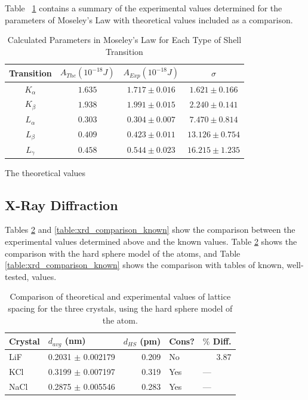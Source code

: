 \documentclass[%
 reprint,
 amsmath,amssymb,
 aps,
 pra,
]{revtex4-1}
\begin{document}
Table ~\ref{Tab:MoseLawSummary} contains a summary of the experimental values determined for the parameters of Moseley's Law with theoretical values included as a comparison.

\begin{table}[htbp]
	\begin{center}
		\begin{tabular}{|c|c|c|c|}
			\hline Transition & $A_{The} (10^{-18} J)$  & $A_{Exp} (10^{-18} J) $ & $\sigma$ \\
			\hline $K_{\alpha}$ & $1.635$ & $1.717 \pm 0.016$ & $1.621 \pm 0.166$ \\
			\hline $K_{\beta}$ & $1.938$ & $1.991 \pm 0.015$ & $2.240 \pm 0.141$ \\
			\hline $L_{\alpha}$ & $0.303$ & $0.304 \pm 0.007$ & $7.470 \pm 0.814$ \\
			\hline $L_{\beta}$ & $0.409$ & $0.423 \pm 0.011$ & $13.126 \pm 0.754$ \\
			\hline $L_{\gamma}$ & $0.458$ & $0.544 \pm 0.023$ & $16.215 \pm 1.235$ \\
			\hline
		\end{tabular}
	\end{center}
	\caption{Calculated Parameters in Moseley's Law for Each Type of Shell Transition}
	\label{Tab:MoseLawSummary}
\end{table}

The theoretical values 

\subsection{X-Ray Diffraction}

Tables \ref{table:xrd_comparison_hard_sphere} and \ref{table:xrd_comparison_known} show the comparison between the experimental values determined above and the known values. Table \ref{table:xrd_comparison_hard_sphere} shows the comparison with the hard sphere model of the atoms, and Table \ref{table:xrd_comparison_known} shows the comparison with tables of known, well-tested, values.

\begin{table}[htbp]
	\begin{center}
	\begin{tabular}{|l|r|r|l|l|}
		\hline
		Crystal & \multicolumn{1}{l|}{$d_{avg}$ (nm)}  & \multicolumn{1}{l|}{$d_{HS}$ (pm)} & Cons? & $\%$ Diff. \\ \hline
		LiF & 0.2031 $\pm$ 0.002179 & 0.209 & No & \multicolumn{1}{r|}{3.87} \\ \hline
		KCl & 0.3199 $\pm$ 0.007197 & 0.319 & Yes & --- \\ \hline
		NaCl & 0.2875 $\pm$ 0.005546 & 0.283 & Yes & --- \\ \hline
	\end{tabular}
	\end{center}
	\caption{Comparison of theoretical and experimental values of lattice spacing for the three crystals, using the hard sphere model of the atom.}
	\label{table:xrd_comparison_hard_sphere}
\end{table}
\end{document}
